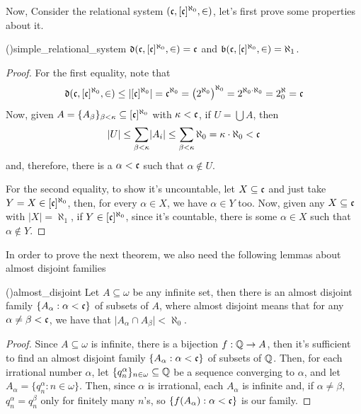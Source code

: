 Now, Consider the relational system $(\mathfrak{c},[\mathfrak{c}]^{\aleph_0},\in)$, let's first prove some properties about it.

\begin{lemma}{(\cite{brech})}{simple_relational_system}
    $\mathfrak{d}(\mathfrak{c},[\mathfrak{c}]^{\aleph_0},\in)=\mathfrak{c}$ and $\mathfrak{b}(\mathfrak{c},[\mathfrak{c}]^{\aleph_0},\in)=\aleph_1$.
\end{lemma}

\begin{proof}
    For the first equality, note that
    $$\mathfrak{d}(\mathfrak{c},[\mathfrak{c}]^{\aleph_0},\in)\leq\lvert[\mathfrak{c}]^{\aleph_0}\rvert=\mathfrak{c}^{\aleph_0}={\left(2^{\aleph_0}\right)}^{\aleph_0}=2^{\aleph_0\cdot\aleph_0}=2^\aleph_0=\mathfrak{c}$$
    Now, given $A=\{A_\beta\}_{\beta<\kappa}\subseteq[\mathfrak{c}]^{\aleph_0}$ with $\kappa<\mathfrak{c}$, if $U=\bigcup A$, then
    $$\lvert U\rvert\leq\sum_{\beta<\kappa}\lvert A_i\rvert\leq\sum_{\beta<\kappa}\aleph_0=\kappa\cdot\aleph_0<\mathfrak{c}$$
    and, therefore, there is a $\alpha<\mathfrak{c}$ such that $\alpha\notin U$.

    For the second equality, to show it's uncountable, let $X\subseteq\mathfrak{c}$ and just take $Y=X\in[\mathfrak{c}]^{\aleph_0}$, then, for every $\alpha\in X$, we have $\alpha\in Y$ too. Now, given any $X\subseteq\mathfrak{c}$ with $\lvert X\rvert=\aleph_1$, if $Y\in[\mathfrak{c}]^{\aleph_0}$, since it's countable, there is some $\alpha\in X$ such that $\alpha\notin Y$.
\end{proof}

In order to prove the next theorem, we also need the following lemmas about almost disjoint families

\begin{lemma}{(\cite{brech})}{almost_disjoint}
    Let $A\subseteq\omega$ be any infinite set, then there is an almost disjoint family $\{A_\alpha:\alpha<\mathfrak{c}\}$ of subsets of $A$, where almost disjoint means that for any $\alpha\neq\beta<\mathfrak{c}$, we have that $\lvert A_\alpha\cap A_\beta\rvert<\aleph_0$.
\end{lemma}

\begin{proof}
    Since $A\subseteq\omega$ is infinite, there is a bijection $f:\mathbb{Q}\to A$, then it's sufficient to find an almost disjoint family $\{A_\alpha:\alpha<\mathfrak{c}\}$ of subsets of $\mathbb{Q}$. Then, for each irrational number $\alpha$, let $\{q_n^\alpha\}_{n\in\omega}\subseteq\mathbb{Q}$ be a sequence converging to $\alpha$, and let $A_\alpha=\{q^\alpha_n:n\in\omega\}$. Then, since $\alpha$ is irrational, each $A_\alpha$ is infinite and, if $\alpha\neq\beta$, $q_n^\alpha=q_n^\beta$ only for finitely many $n$'s, so $\{f(A_\alpha):\alpha<\mathfrak{c}\}$ is our family.
\end{proof}

